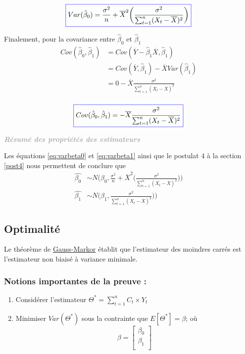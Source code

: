 \documentclass[11pt,french]{report}
\newenvironment{moreInfo}[1]
	{\begin{mdframed}
	\textcolor{darkgray}{\huge \raisebox{-3.5pt}{\faInfo} 
	\hspace{0.5cm} \large\bfseries #1}\\[5pt]
	\normalsize
	\makebox[0.1\textwidth][l]{}	
	\begin{minipage}{10cm}}
	{	\end{minipage}
	\end{mdframed}}
\begin{document}
\begin{equation}
\label{eq:varbeta0}
\color{blue}
\boxed{\color{black}
Var(\hat{\beta}_0) = \frac{\sigma^2}{n}  + \overline{X}^2 \bigg(\frac{\sigma^2}{\sum_{t=1}^n (X_t - \overline{X})^2}\bigg)}
\end{equation}

Finalement, pour la covariance entre $\hat{\beta}_0$ et $\hat{\beta}_1$
\begin{align*}
Cov(\hat{\beta}_0, \hat{\beta}_1) &= Cov(\overline{Y} - \hat{\beta}_1\overline{X}, \hat{\beta}_1) \\
&= Cov(\overline{Y},  \hat{\beta}_1) - \overline{X} Var(\hat{\beta}_1) \\
&= 0 - \overline{X} \frac{\sigma^2}{\sum_{t=1}^n (X_t - \overline{X})^2} \\
\end{align*}

\begin{equation}
\label{eq:covariance}
\color{blue}
\boxed{\color{black}
Cov(\hat{\beta}_0, \hat{\beta}_1) = - \overline{X} \frac{\sigma^2}{\sum_{t=1}^n (X_t - \overline{X})^2}}
\end{equation}

\bigskip
\begin{moreInfo}{\emph{Résumé des propriétés des estimateurs}}
	Les équations \ref{eq:varbeta0} et \ref{eq:varbeta1}  ainsi que le postulat 4 à la section \ref{post4} nous permettent de conclure que 
	\begin{align*}
	     \hat{\beta_0} &\sim N\Bigg(\beta_0, \frac{\sigma^2}{n}  + \overline{X}^2 \bigg(\frac{\sigma^2}{\sum_{t=1}^n (X_t - \overline{X})^2}\bigg)\Bigg) \\
	     \hat{\beta_1} &\sim N\Bigg(\beta_1, \frac{\sigma^2}{\sum_{t=1}^n(X_t - \overline{X})^2})\Bigg)
	\end{align*}

\end{moreInfo}
\bigskip

\subsection{Optimalité}
Le théorème de \href{https://fr.wikipedia.org/wiki/Théorème_de_Gauss-Markov}{Gauss-Markor} établit que l'estimateur des moindres carrés est l'estimateur non biaisé à variance minimale.

\subsubsection*{Notions importantes de la preuve :}
\begin{enumerate}
\item Considérer l'estimateur $\Theta^* = \sum_{t=1}^n C_t \times Y_t$
\item Minimiser $Var(\Theta^*)$ sous la contrainte que $E[\Theta^*] = \beta$; où
$$ \beta =
\begin{bmatrix}
  \beta_0 \\
  \beta_1 \\ 
\end{bmatrix} $$
\end{enumerate}
\end{document}
